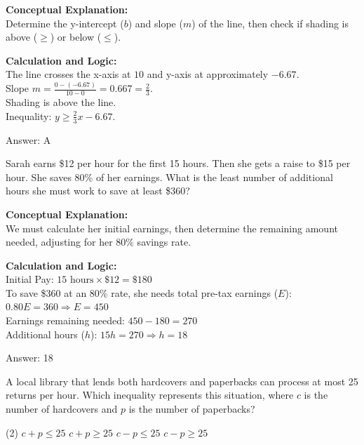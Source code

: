 \documentclass[11pt,paper=a4,answers]{exam}
\begin{document}
\begin{questions}
\begin{solution}
\textbf{Conceptual Explanation:} \\
Determine the y-intercept ($b$) and slope ($m$) of the line, then check if shading is above ($\ge$) or below ($\le$).

\vspace{10pt}
\textbf{Calculation and Logic:} \\
The line crosses the x-axis at $10$ and y-axis at approximately $-6.67$. \\
Slope $m = \frac{0 - (-6.67)}{10 - 0} = 0.667 = \frac{2}{3}$. \\
Shading is above the line. \\
Inequality: $y \ge \frac{2}{3}x - 6.67$.

\vspace{15pt}
Answer: \colorbox{yellow!100}{A}
\end{solution}

\question
Sarah earns \$12 per hour for the first 15 hours. Then she gets a raise to \$15 per hour. She saves 80\% of her earnings. What is the least number of additional hours she must work to save at least \$360?

\begin{solution}
\textbf{Conceptual Explanation:} \\
We must calculate her initial earnings, then determine the remaining amount needed, adjusting for her 80\% savings rate.

\vspace{10pt}
\textbf{Calculation and Logic:} \\
Initial Pay: $15 \text{ hours} \times \$12 = \$180$ \\
To save \$360 at an 80\% rate, she needs total pre-tax earnings ($E$): \\
$0.80E = 360 \Rightarrow E = 450$ \\
Earnings remaining needed: $450 - 180 = 270$ \\
Additional hours ($h$): $15h = 270 \Rightarrow h = 18$

\vspace{15pt}
Answer: \colorbox{yellow!100}{18}
\end{solution}

\question
A local library that lends both hardcovers and paperbacks can process at most 25 returns per hour. Which inequality represents this situation, where $c$ is the number of hardcovers and $p$ is the number of paperbacks?
\begin{tasks}(2)
    \task $c + p \le 25$
    \task $c + p \ge 25$
    \task $c - p \le 25$
    \task $c - p \ge 25$
\end{tasks}


\end{questions}
\end{document}
